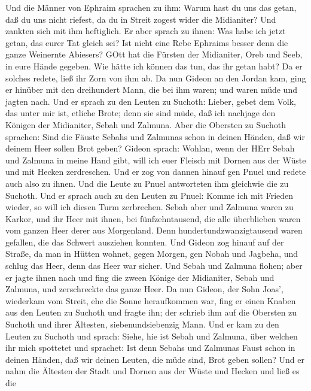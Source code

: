  Und die Männer von Ephraim sprachen zu ihm: Warum hast du
uns das getan, daß du uns nicht riefest, da du in Streit zogest wider
die Midianiter? Und zankten sich mit ihm heftiglich.  Er
aber sprach zu ihnen: Was habe ich jetzt getan, das eurer Tat gleich
sei? Ist nicht eine Rebe Ephraims besser denn die ganze Weinernte
Abiesers?  GOtt hat die Fürsten der Midianiter, Oreb und
Seeb, in eure Hände gegeben. Wie hätte ich können das tun, das ihr getan
habt? Da er solches redete, ließ ihr Zorn von ihm ab.  Da
nun Gideon an den Jordan kam, ging er hinüber mit den dreihundert Mann,
die bei ihm waren; und waren müde und jagten nach.  Und er
sprach zu den Leuten zu Suchoth: Lieber, gebet dem Volk, das unter mir
ist, etliche Brote; denn sie sind müde, daß ich nachjage den Königen der
Midianiter, Sebah und Zalmuna.  Aber die Obersten zu Suchoth
sprachen: Sind die Fäuste Sebahs und Zalmunas schon in deinen Händen,
daß wir deinem Heer sollen Brot geben?  Gideon sprach:
Wohlan, wenn der HErr Sebah und Zalmuna in meine Hand gibt, will ich
euer Fleisch mit Dornen aus der Wüste und mit Hecken zerdreschen.
 Und er zog von dannen hinauf gen Pnuel und redete auch also
zu ihnen. Und die Leute zu Pnuel antworteten ihm gleichwie die zu
Suchoth.  Und er sprach auch zu den Leuten zu Pnuel: Komme
ich mit Frieden wieder, so will ich diesen Turm zerbrechen.
 Sebah aber und Zalmuna waren zu Karkor, und ihr Heer mit
ihnen, bei fünfzehntausend, die alle überblieben waren vom ganzen Heer
derer aus Morgenland. Denn hundertundzwanzigtausend waren gefallen, die
das Schwert ausziehen konnten.  Und Gideon zog hinauf auf
der Straße, da man in Hütten wohnet, gegen Morgen, gen Nobah und
Jagbeha, und schlug das Heer, denn das Heer war sicher. 
Und Sebah und Zalmuna flohen; aber er jagte ihnen nach und fing die
zween Könige der Midianiter, Sebah und Zalmuna, und zerschreckte das
ganze Heer.  Da nun Gideon, der Sohn Joas', wiederkam vom
Streit, ehe die Sonne heraufkommen war,  fing er einen
Knaben aus den Leuten zu Suchoth und fragte ihn; der schrieb ihm auf die
Obersten zu Suchoth und ihrer Ältesten, siebenundsiebenzig Mann.
 Und er kam zu den Leuten zu Suchoth und sprach: Siehe, hie
ist Sebah und Zalmuna, über welchen ihr mich spottetet und sprachet: Ist
denn Sebahs und Zalmunas Faust schon in deinen Händen, daß wir deinen
Leuten, die müde sind, Brot geben sollen?  Und er nahm die
Ältesten der Stadt und Dornen aus der Wüste und Hecken und ließ es die
